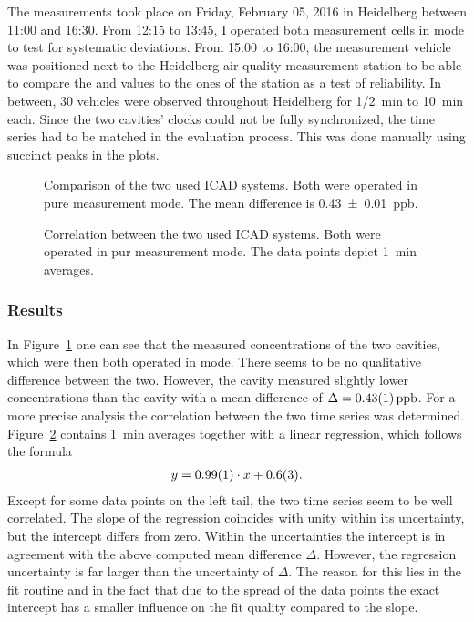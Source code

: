 The measurements took place on Friday, February 05, 2016 in Heidelberg
between 11:00 and 16:30. From 12:15 to 13:45, I operated both
measurement cells
in  mode to test for systematic deviations. From 15:00 to
16:00, the measurement vehicle was positioned next to the Heidelberg
air quality measurement station to be able to compare the  and
 values to the ones of the station as a test of
reliability. In between, 30 vehicles were observed throughout
Heidelberg for {\nfrac{} 1/2}~\si{\minute} to \SI{10}{\minute} each.
Since the two cavities' clocks could not be fully synchronized, the
time series had to be matched in the evaluation process. This was done
manually using succinct peaks in the plots.

\begin{figure}[htbp]
  \centering
  
  \caption{Comparison of the two used ICAD systems. Both were
    operated in pure  measurement mode. The mean difference is
    \SI{0.43 \pm 0.01}{ppb}.}
  \label{fig:hd-comparison}
\end{figure}
\begin{figure}[htbp]
  \centering
  
  \caption{Correlation between the two used ICAD systems. Both were
    operated in pur  measurement mode. The data points depict
    \SI{1}{\minute} averages.}
  \label{fig:hd-corr}
\end{figure}

\subsubsection{Results}
\label{sec:vehicle-results}

In Figure~\ref{fig:hd-comparison} one can see that the measured
 concentrations of the two cavities, which were then both
operated in  mode. There seems to be no qualitative difference
between the two. However, the  cavity measured slightly lower
concentrations than the  cavity with a mean difference of
$\Delta = \SI{0.43\pm0.01}{ppb}$. For a more precise analysis the
correlation between the two time series was
determined. Figure~\ref{fig:hd-corr} contains \SI{1}{\minute} averages
together with a linear regression, which follows the formula
\begin{align*}
  y = \num{0.99 \pm 0.01} \cdot x + \num{0.6 \pm 0.3}.
\end{align*}
Except for some data points on the left tail, the two time series seem
to be well correlated. The slope of the regression coincides with
unity within its uncertainty, but the intercept differs from
zero. Within the uncertainties the intercept is in agreement with the
above computed mean difference $\Delta$. However, the regression
uncertainty is far larger than the uncertainty of $\Delta$. The reason
for this lies in the fit routine and in the fact that due to the
spread of the data points the exact intercept has a smaller influence
on the fit quality compared to the slope.

